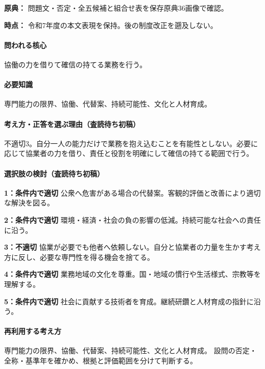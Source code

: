 \noindent\textbf{原典：} 問題文・否定・全五候補と組合せ表を保存原典36画像で確認。\par

\noindent\textbf{時点：} 令和7年度の本文表現を保持。後の制度改正を遡及しない。\par

\paragraph{問われる核心} 協働の力を借りて確信の持てる業務を行う。

\paragraph{必要知識} 専門能力の限界、協働、代替案、持続可能性、文化と人材育成。

\paragraph{考え方・正答を選ぶ理由（査読待ち初稿）} 不適切3。自分一人の能力だけで業務を抱え込むことを有能性としない。必要に応じて協業者の力を借り、責任と役割を明確にして確信の持てる範囲で行う。

\paragraph{選択肢の検討（査読待ち初稿）}\mbox{}\par

\noindent\textbf{1：条件内で適切} 公衆へ危害がある場合の代替案。客観的評価と改善により適切な解決を図る。\par

\noindent\textbf{2：条件内で適切} 環境・経済・社会の負の影響の低減。持続可能な社会への責任に沿う。\par

\noindent\textbf{3：不適切} 協業が必要でも他者へ依頼しない。自分と協業者の力量を生かす考え方に反し、必要な専門性を得る機会を捨てる。\par

\noindent\textbf{4：条件内で適切} 業務地域の文化を尊重。国・地域の慣行や生活様式、宗教等を理解する。\par

\noindent\textbf{5：条件内で適切} 社会に貢献する技術者を育成。継続研鑽と人材育成の指針に沿う。\par

\paragraph{再利用する考え方} 専門能力の限界、協働、代替案、持続可能性、文化と人材育成。 設問の否定・全称・基準年を確かめ、根拠と評価範囲を分けて判断する。

